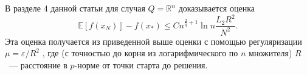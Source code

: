 \documentclass[11pt]{article}
\newcommand{\E}{\mathbb{E}}
\newcommand{\RR}{\mathbb{R}}
\begin{document}
	В разделе 4 данной статьи для случая $Q = \RR^n$ доказывается оценка
	\begin{equation}\label{main_estimation}
		\E[f\left( {x_N } \right)] - f(x_{*}) \le Cn^{\frac{2}{q}+1}\ln n\frac{L_2 R^2}{N^2}.
	\end{equation}
	Эта оценка получается из приведенной выше оценки с помощью регуляризации $\mu = \varepsilon/R^2$ \cite{Gasn_Universal_2018}, где (с точностью до корня из логарифмического по $n$ множителя) $R$~--- расстояние в $p$-норме от точки старта до решения.
	
		

	
	
	
	

\end{document}
